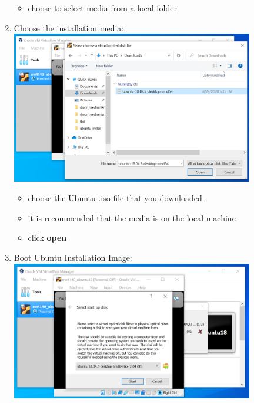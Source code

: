 \documentclass[12pt]{article}
\begin{document}
\begin{description}
\begin{description}
\begin{enumerate}
\begin{itemize}
                 \item choose to select media from a local folder 
                 
            \end{itemize}

\newpage	
\item Choose the installation media: \vspace{5mm} \\
      		\hspace*{-2.5cm}\includegraphics[scale=.6]{Capture11.png} \\
               \begin{itemize}
                    
     
                \item choose the Ubuntu .iso file that you downloaded.
                \item it is recommended that the media is on the local machine
                \item click {\bf open}
                
            \end{itemize}
\vspace{10mm}
\item Boot Ubuntu Installation Image: \vspace{5mm} \\
      		\hspace*{-2.5cm}\includegraphics[scale=.6]{Capture12.png}
            \begin{itemize}
                    

\end{itemize}
\end{enumerate}
\end{description}
\end{description}
\end{document}
